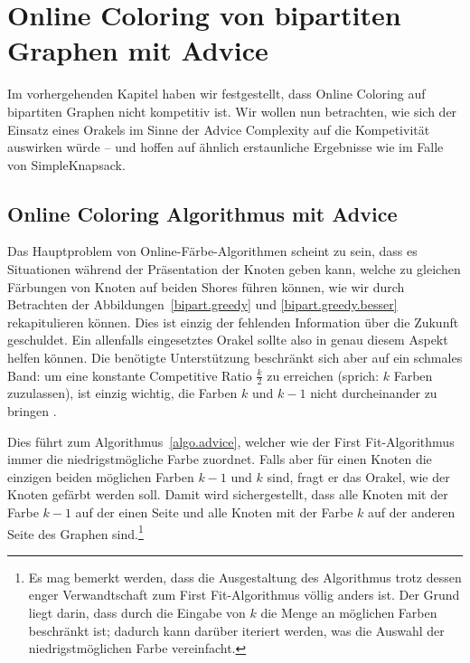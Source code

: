 \documentclass[11pt]{scrreprt} %
\theoremstyle{definition}
\begin{document}
\begin{figure}
\begin{center}
\end{center}
\end{figure}


\chapter{Online Coloring von bipartiten Graphen mit Advice}

Im vorhergehenden Kapitel haben wir festgestellt, dass Online Coloring auf bipartiten Graphen nicht kompetitiv ist. Wir wollen nun betrachten, wie sich der Einsatz eines Orakels im Sinne der Advice Complexity auf die Kompetivität auswirken würde -- und hoffen auf ähnlich erstaunliche Ergebnisse wie im Falle von {\sc SimpleKnapsack}.

\section{Online Coloring Algorithmus mit Advice}

\bigskip
Das Hauptproblem von Online-Färbe-Algorithmen scheint zu sein, dass es Situationen während der Präsentation der Knoten geben kann, welche zu gleichen Färbungen von Knoten auf beiden Shores führen können, wie wir durch Betrachten der Abbildungen~\ref{bipart.greedy} und \ref{bipart.greedy.besser} rekapitulieren können. Dies ist einzig der fehlenden Information über die Zukunft geschuldet. Ein allenfalls eingesetztes Orakel sollte also in genau diesem Aspekt helfen können. Die benötigte Unterstützung beschränkt sich aber auf ein schmales Band: um eine konstante Competitive Ratio $\frac k 2$ zu erreichen (sprich: $k$ Farben zuzulassen), ist einzig wichtig, die Farben $k$ und $k-1$ nicht durcheinander zu bringen \cite{bipartite}.

\bigskip
Dies führt zum Algorithmus~\ref{algo.advice}, welcher wie der First Fit-Algorithmus immer die niedrigstmögliche Farbe zuordnet. Falls aber für einen Knoten die einzigen beiden möglichen Farben $k-1$ und $k$ sind, fragt er das Orakel, wie der Knoten gefärbt werden soll. Damit wird sichergestellt, dass alle Knoten mit der Farbe $k-1$ auf der einen Seite und alle Knoten mit der Farbe $k$ auf der anderen Seite des Graphen sind.\footnote{Es mag bemerkt werden, dass die Ausgestaltung des Algorithmus trotz dessen enger Verwandtschaft zum First Fit-Algorithmus völlig anders ist. Der Grund liegt darin, dass durch die Eingabe von $k$ die Menge an möglichen Farben beschränkt ist; dadurch kann darüber iteriert werden, was die Auswahl der niedrigstmöglichen Farbe vereinfacht.}
\end{document}
